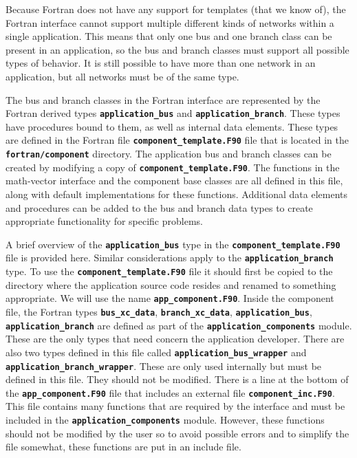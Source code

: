 \documentclass[12pt]{report} %
\begin{document}
Because Fortran does not have any support for templates (that we know of), the Fortran interface cannot support multiple different kinds of networks within a single application. This means that only one bus and one branch class can be present in an application, so the bus and branch classes must support all possible types of behavior. It is still possible to have more than one network in an application, but all networks must be of the same type.

The bus and branch classes in the Fortran interface are represented by the Fortran derived types \texttt{\textbf{application\_bus}} and \texttt{\textbf{application\_branch}}. These types have procedures bound to them, as well as internal data elements. These types are defined in the Fortran file \texttt{\textbf{component\_template.F90}} file that is located in the \texttt{\textbf{fortran/component}} directory. The application bus and branch classes can be created by modifying a copy of \texttt{\textbf{component\_template.F90}}. The functions in the math-vector interface and the component base classes are all defined in this file, along with default implementations for these functions. Additional data elements and procedures can be added to the bus and branch data types to create appropriate functionality for specific problems.

A brief overview of the \texttt{\textbf{application\_bus}} type in the \texttt{\textbf{component\_template.F90}} file is provided here. Similar considerations apply to the \texttt{\textbf{application\_branch}} type. To use the \texttt{\textbf{component\_template.F90}} file it should first be copied to the directory where the application source code resides and renamed to something appropriate. We will use the name \texttt{\textbf{app\_component.F90}}. Inside the component file, the Fortran types \texttt{\textbf{bus\_xc\_data}}, \texttt{\textbf{branch\_xc\_data}}, \texttt{\textbf{application\_bus}}, \texttt{\textbf{application\_branch}} are defined as part of the \texttt{\textbf{application\_components}} module. These are the only types that need concern the application developer. There are also two types defined in this file called \texttt{\textbf{application\_bus\_wrapper}} and \texttt{\textbf{application\_branch\_wrapper}}. These are only used internally but must be defined in this file. They should not be modified. There is a line at the bottom of the \texttt{\textbf{app\_component.F90}} file that includes an external file \texttt{\textbf{component\_inc.F90}}. This file contains many functions that are required by the interface and must be included in the \texttt{\textbf{application\_components}} module. However, these functions should not be modified by the user so to avoid possible errors and to simplify the file somewhat, these functions are put in an include file.
\end{document}
